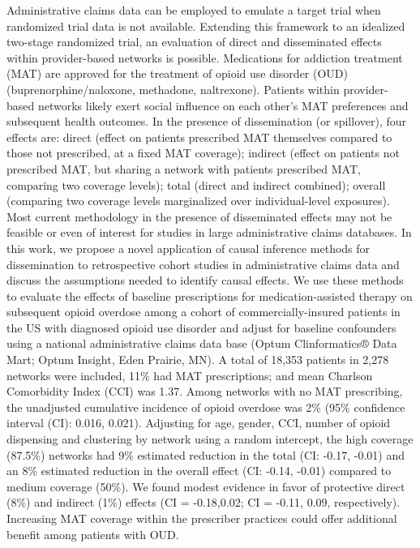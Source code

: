 \begin{itemize}
Administrative claims data can be employed to emulate a target trial when randomized trial data is not available. Extending this framework to an idealized two-stage randomized trial, an evaluation of direct and disseminated effects within provider-based networks is possible. Medications for addiction treatment (MAT) are approved for the treatment of opioid use disorder (OUD) (buprenorphine/naloxone, methadone, naltrexone). Patients within provider-based networks likely exert social influence on each other's MAT preferences and subsequent health outcomes. In the presence of dissemination (or spillover), four effects are: direct (effect on patients prescribed MAT themselves compared to those not prescribed, at a fixed MAT coverage); indirect (effect on patients not prescribed MAT, but sharing a network with patients prescribed MAT, comparing two coverage levels); total (direct and indirect combined); overall (comparing two coverage levels marginalized over individual-level exposures).  Most current methodology in the presence of disseminated effects may not be feasible or even of interest for studies in large administrative claims databases. In this work, we propose a novel application of causal inference methods for dissemination to retrospective cohort studies in administrative claims data and discuss the assumptions needed to identify causal effects. We use these methods to evaluate the effects of baseline prescriptions for medication-assisted therapy on subsequent opioid overdose among a cohort of commercially-insured patients in the US with diagnosed opioid use disorder and adjust for baseline confounders using a national administrative claims data base (Optum Clinformatics® Data Mart; Optum Insight, Eden Prairie, MN). A total of 18,353 patients in 2,278 networks were included, 11\% had MAT prescriptions; and mean Charlson Comorbidity Index (CCI) was 1.37. Among networks with no MAT prescribing, the unadjusted cumulative incidence of opioid overdose was 2\% (95\% confidence interval (CI): 0.016, 0.021). Adjusting for age, gender, CCI, number of opioid dispensing and clustering by network using a random intercept, the high coverage (87.5\%) networks had 9\% estimated reduction in the total (CI: -0.17, -0.01) and an 8\% estimated reduction in the overall effect (CI: -0.14, -0.01) compared to medium coverage (50\%). We found modest evidence in favor of protective direct (8\%) and indirect (1\%) effects (CI = -0.18,0.02; CI = -0.11, 0.09, respectively). Increasing MAT coverage within the prescriber practices could offer additional benefit among patients with OUD.


\end{itemize}
